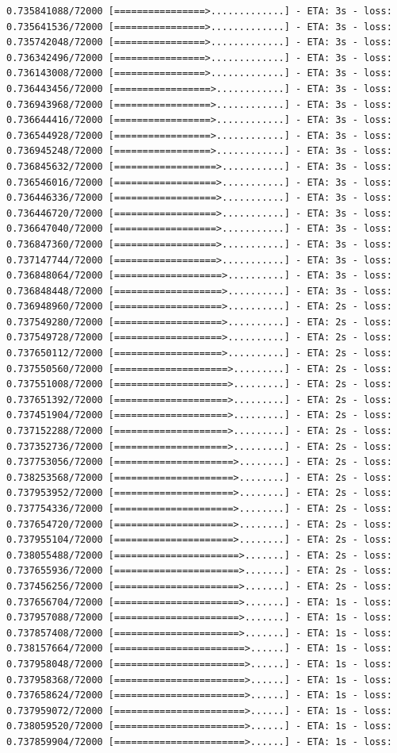 \documentclass[12pt,fleqn]{article}\usepackage{../../common}
\begin{document}
\begin{verbatim}
0.735841088/72000 [================>.............] - ETA: 3s - loss: 0.735641536/72000 [================>.............] - ETA: 3s - loss: 0.735742048/72000 [================>.............] - ETA: 3s - loss: 0.736342496/72000 [================>.............] - ETA: 3s - loss: 0.736143008/72000 [================>.............] - ETA: 3s - loss: 0.736443456/72000 [=================>............] - ETA: 3s - loss: 0.736943968/72000 [=================>............] - ETA: 3s - loss: 0.736644416/72000 [=================>............] - ETA: 3s - loss: 0.736544928/72000 [=================>............] - ETA: 3s - loss: 0.736945248/72000 [=================>............] - ETA: 3s - loss: 0.736845632/72000 [==================>...........] - ETA: 3s - loss: 0.736546016/72000 [==================>...........] - ETA: 3s - loss: 0.736446336/72000 [==================>...........] - ETA: 3s - loss: 0.736446720/72000 [==================>...........] - ETA: 3s - loss: 0.736647040/72000 [==================>...........] - ETA: 3s - loss: 0.736847360/72000 [==================>...........] - ETA: 3s - loss: 0.737147744/72000 [==================>...........] - ETA: 3s - loss: 0.736848064/72000 [===================>..........] - ETA: 3s - loss: 0.736848448/72000 [===================>..........] - ETA: 3s - loss: 0.736948960/72000 [===================>..........] - ETA: 2s - loss: 0.737549280/72000 [===================>..........] - ETA: 2s - loss: 0.737549728/72000 [===================>..........] - ETA: 2s - loss: 0.737650112/72000 [===================>..........] - ETA: 2s - loss: 0.737550560/72000 [====================>.........] - ETA: 2s - loss: 0.737551008/72000 [====================>.........] - ETA: 2s - loss: 0.737651392/72000 [====================>.........] - ETA: 2s - loss: 0.737451904/72000 [====================>.........] - ETA: 2s - loss: 0.737152288/72000 [====================>.........] - ETA: 2s - loss: 0.737352736/72000 [====================>.........] - ETA: 2s - loss: 0.737753056/72000 [=====================>........] - ETA: 2s - loss: 0.738253568/72000 [=====================>........] - ETA: 2s - loss: 0.737953952/72000 [=====================>........] - ETA: 2s - loss: 0.737754336/72000 [=====================>........] - ETA: 2s - loss: 0.737654720/72000 [=====================>........] - ETA: 2s - loss: 0.737955104/72000 [=====================>........] - ETA: 2s - loss: 0.738055488/72000 [======================>.......] - ETA: 2s - loss: 0.737655936/72000 [======================>.......] - ETA: 2s - loss: 0.737456256/72000 [======================>.......] - ETA: 2s - loss: 0.737656704/72000 [======================>.......] - ETA: 1s - loss: 0.737957088/72000 [======================>.......] - ETA: 1s - loss: 0.737857408/72000 [======================>.......] - ETA: 1s - loss: 0.738157664/72000 [=======================>......] - ETA: 1s - loss: 0.737958048/72000 [=======================>......] - ETA: 1s - loss: 0.737958368/72000 [=======================>......] - ETA: 1s - loss: 0.737658624/72000 [=======================>......] - ETA: 1s - loss: 0.737959072/72000 [=======================>......] - ETA: 1s - loss: 0.738059520/72000 [=======================>......] - ETA: 1s - loss: 0.737859904/72000 [=======================>......] - ETA: 1s - loss: 
\end{verbatim}
\end{document}
